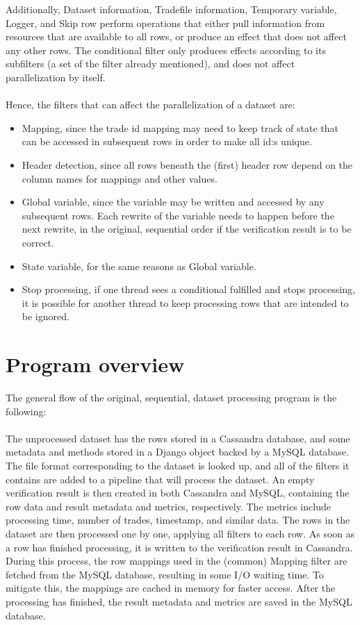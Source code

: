 Additionally, Dataset information, Tradefile information, Temporary variable, Logger, and Skip row perform operations that either pull information from resources that
are available to all rows, or produce an effect that does not affect any other rows. The conditional filter only produces effects according to its subfilters (a set of
the filter already mentioned), and does not affect parallelization by itself.
\\\\
Hence, the filters that can affect the parallelization of a dataset are:
\begin{itemize}
  \item Mapping, since the trade id mapping may need to keep track of state that can be accessed in subsequent rows in order to make all id:s unique.
  \item Header detection, since all rows beneath the (first) header row depend on the column names for mappings and other values.
  \item Global variable, since the variable may be written and accessed by any subsequent rows. Each rewrite of the variable needs to happen before the next rewrite,
    in the original, sequential order if the verification result is to be correct.
  \item State variable, for the same reasons as Global variable.
  \item Stop processing, if one thread sees a conditional fulfilled and stops processing, it is possible for another thread to keep processing rows that are intended
    to be ignored.
\end{itemize}

\section{Program overview} %
The general flow of the original, sequential, dataset processing program is the following:
\\\\
The unprocessed dataset has the rows stored in a Cassandra database, and some metadata and methods stored in a Django object backed by a MySQL database.
The file format corresponding to the dataset is looked up, and all of the filters it contains are added to a pipeline that will process the dataset.
An empty verification result is then created in both Cassandra and MySQL, containing the row data and result metadata and metrics, respectively.
The metrics include processing time, number of trades, timestamp, and similar data. The rows in the dataset are then processed one by one,
applying all filters to each row. As soon as a row has finished processing, it is written to the verification result in Cassandra.
During this process, the row mappings used in the (common) Mapping filter are fetched from the MySQL database, resulting in some
I/O waiting time. To mitigate this, the mappings are cached in memory for faster access. After the processing has finished, the result metadata
and metrics are saved in the MySQL database.

